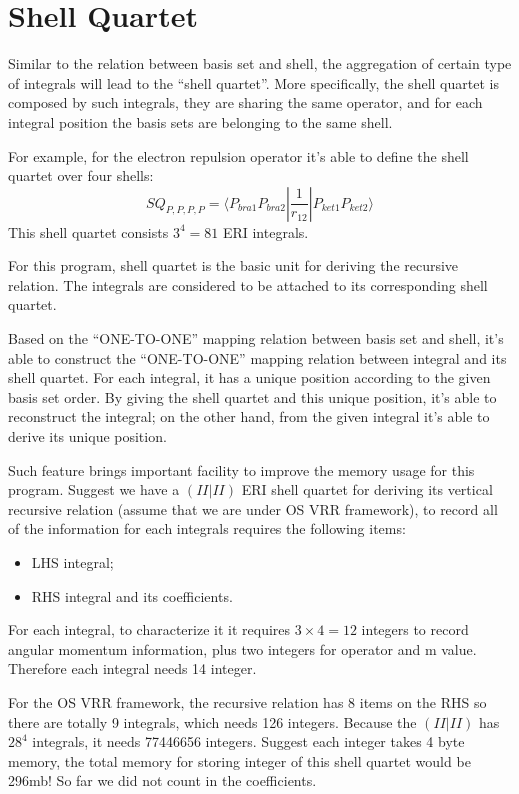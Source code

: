 \section{Shell Quartet}
%
%
\label{shell_quartet}
Similar to the relation between basis set and shell, the aggregation 
of certain type of integrals will lead to the ``shell quartet''.
More specifically, the shell quartet is composed by such integrals,
they are sharing the same operator, and for each integral position
the basis sets are belonging to the same shell.

For example, for the electron repulsion operator it's able to define 
the shell quartet over four shells:
\begin{equation}
 SQ_{P,P,P,P} = \langle P_{bra1}P_{bra2}|
 \frac{1}{r_{12}}|P_{ket1}P_{ket2} \rangle
\end{equation}
This shell quartet consists $3^{4} = 81$ ERI integrals.

For this program, shell quartet is the basic unit for deriving the 
recursive relation. The integrals are considered to be attached to 
its corresponding shell quartet.

Based on the ``ONE-TO-ONE'' mapping relation between basis set 
and shell, it's able to construct the ``ONE-TO-ONE'' mapping relation
between integral and its shell quartet. For each integral, it 
has a unique position according to the given basis set order. 
By giving the shell quartet and this unique position, it's able 
to reconstruct the integral; on the other hand, from the given 
integral it's able to derive its unique position.

Such feature brings important facility to improve the memory 
usage for this program. Suggest we have a $(II|II)$ ERI shell 
quartet for deriving its vertical recursive relation (assume
that we are under OS VRR framework), to record
all of the information for each integrals requires the following 
items:
\begin{itemize}
 \item LHS integral;
 \item RHS integral and its coefficients.
\end{itemize}

For each integral, to characterize it it requires $3\times 4 = 12$
integers to record angular momentum information, plus two integers
for operator and m value. Therefore each integral needs 14 integer.

For the OS VRR framework, the recursive relation has 8 items on the 
RHS so there are totally 9 integrals, which needs 126 integers. 
Because the $(II|II)$ has $28^4$ integrals, it needs 77446656 integers.
Suggest each integer takes 4 byte memory, the total memory for 
storing integer of this shell quartet would be 296mb! So far we did not
count in the coefficients.

